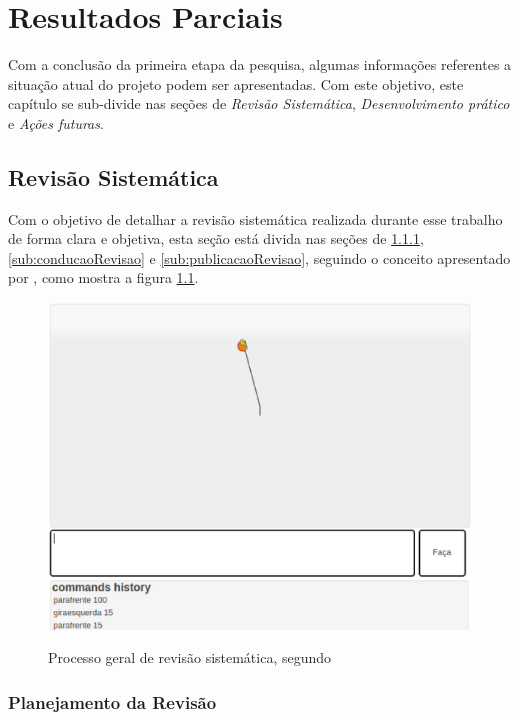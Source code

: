 \chapter[Resultados Parciais]{Resultados Parciais}
\label{sec:resultados_parciais}

Com a conclusão da primeira etapa da pesquisa, algumas informações referentes a situação atual do projeto podem ser apresentadas. Com este objetivo, este capítulo se sub-divide nas seções de \textit{Revisão Sistemática}, \textit{Desenvolvimento prático} e \textit{Ações futuras}.

\section{Revisão Sistemática} %
\label{sec:revisão_sistemática}

	Com o objetivo de detalhar a revisão sistemática realizada durante esse trabalho de forma clara e objetiva, esta seção está divida nas seções de \ref{sub:planejamentoRevisao}, \ref{sub:conducaoRevisao} e \ref{sub:publicacaoRevisao}, seguindo o conceito apresentado por \cite{Kitchenham}, como mostra a figura \ref{img:processoGeralRevisao}.

	\begin{figure}[H]
			\centering
			\caption{Processo geral de revisão sistemática, segundo \cite{Kitchenham}}
			\includegraphics[scale=0.7]{figuras/ambienteLogo.eps}
			\label{img:processoGeralRevisao}
		\end{figure}

	\subsection{Planejamento da Revisão} %
	\label{sub:planejamentoRevisao}

